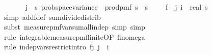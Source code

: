 \begin{isabellebody}
\ \ \ \ \ \ \ {\isacharparenleft}{\kern0pt}{\isasymSum}j\ {\isacharequal}{\kern0pt}\ {}{\isachardot}{\kern0pt}{\isachardot}{\kern0pt}{\isacharless}{\kern0pt}s\ prob{\isacharunderscore}{\kern0pt}space{\isachardot}{\kern0pt}variance\ \ {\isacharparenleft}{\kern0pt}prod{\isacharunderscore}{\kern0pt}pmf\ {\isacharparenleft}{\kern0pt}{\isacharbraceleft}{\kern0pt}{}{\isachardot}{\kern0pt}{\isachardot}{\kern0pt}{\isacharless}{\kern0pt}s\ {\isasymtimes}\ {\isacharbraceleft}{\kern0pt}{}{\isachardot}{\kern0pt}{\isachardot}{\kern0pt}{\isacharless}{\kern0pt}s\ {\isacharparenleft}{\kern0pt}{\isasymlambda}{\isacharunderscore}{\kern0pt}{\isachardot}{\kern0pt}\ {\isasymOmega}{\isacharparenright}{\kern0pt}{\isacharparenright}{\kern0pt}\ \ {\isacharparenleft}{\kern0pt}{\isasymlambda}{\isasymomega}{\isachardot}{\kern0pt}\ f{}\ {\isasymomega}\ j\ i\ {\isacharslash}{\kern0pt}\ real\ s\isanewline
\ \ \ \ \ \ \isamarkupfalse%
\ {\isacharparenleft}{\kern0pt}simp\ add{\isacharcolon}{\kern0pt}f{}{\isacharunderscore}{\kern0pt}def\ sum{\isacharunderscore}{\kern0pt}divide{\isacharunderscore}{\kern0pt}distrib{\isacharparenright}{\kern0pt}\isanewline
\ \ \ \ \ \ \isamarkupfalse%
\ {\isacharparenleft}{\kern0pt}subst\ measure{\isacharunderscore}{\kern0pt}pmf{\isachardot}{\kern0pt}var{\isacharunderscore}{\kern0pt}sum{\isacharunderscore}{\kern0pt}all{\isacharunderscore}{\kern0pt}indep{\isacharcomma}{\kern0pt}\ simp{\isacharcomma}{\kern0pt}\ simp{\isacharparenright}{\kern0pt}\isanewline
\ \ \ \ \ \ \ \ \isamarkupfalse%
\ {\isacharparenleft}{\kern0pt}rule\ integrable{\isacharunderscore}{\kern0pt}measure{\isacharunderscore}{\kern0pt}pmf{\isacharunderscore}{\kern0pt}finite{\isacharbrackleft}{\kern0pt}OF\ fin{\isacharunderscore}{\kern0pt}omega{\isacharunderscore}{\kern0pt}{}{\isacharbrackright}{\kern0pt}{\isacharparenright}{\kern0pt}\isanewline
\ \ \ \ \ \ \ \isamarkupfalse%
\ {\isacharparenleft}{\kern0pt}rule\ indep{\isacharunderscore}{\kern0pt}vars{\isacharunderscore}{\kern0pt}restrict{\isacharunderscore}{\kern0pt}intro{\isacharbrackleft}{\kern0pt}\ f{\isacharequal}{\kern0pt}{\isachardoublequoteopen}{\isasymlambda}j{\isachardot}{\kern0pt}\ {\isacharbraceleft}{\kern0pt}j{\isacharbraceright}{\kern0pt}\ {\isasymtimes}\ {\isacharbraceleft}{\kern0pt}i{\isacharbraceright}{\kern0pt}{\isachardoublequoteclose}{\isacharbrackright}{\kern0pt}{\isacharparenright}{\kern0pt}\isanewline

\end{isabellebody}

